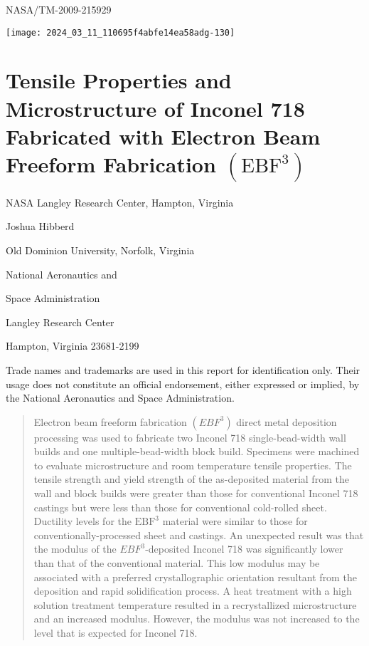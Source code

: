 \documentclass[10pt]{article}
\begin{document}
NASA/TM-2009-215929

\begin{center}
\texttt{[image: 2024\_03\_11\_110695f4abfe14ea58adg-130]}
\end{center}

\section*{Tensile Properties and Microstructure of Inconel 718 Fabricated with Electron Beam Freeform Fabrication $\left(\mathrm{EBF}^{3}\right)$ }
NASA Langley Research Center, Hampton, Virginia

Joshua Hibberd

Old Dominion University, Norfolk, Virginia

National Aeronautics and

Space Administration

Langley Research Center

Hampton, Virginia 23681-2199

Trade names and trademarks are used in this report for identification only. Their usage does not constitute an official endorsement, either expressed or implied, by the National Aeronautics and Space Administration.

\begin{abstract}
Electron beam freeform fabrication $\left(E B F^{3}\right)$ direct metal deposition processing was used to fabricate two Inconel 718 single-bead-width wall builds and one multiple-bead-width block build. Specimens were machined to evaluate microstructure and room temperature tensile properties. The tensile strength and yield strength of the as-deposited material from the wall and block builds were greater than those for conventional Inconel 718 castings but were less than those for conventional cold-rolled sheet. Ductility levels for the $\mathrm{EBF}^{3}$ material were similar to those for conventionally-processed sheet and castings. An unexpected result was that the modulus of the $E B F^{3}$-deposited Inconel 718 was significantly lower than that of the conventional material. This low modulus may be associated with a preferred crystallographic orientation resultant from the deposition and rapid solidification process. A heat treatment with a high solution treatment temperature resulted in a recrystallized microstructure and an increased modulus. However, the modulus was not increased to the level that is expected for Inconel 718.
\end{abstract}
\end{document}
